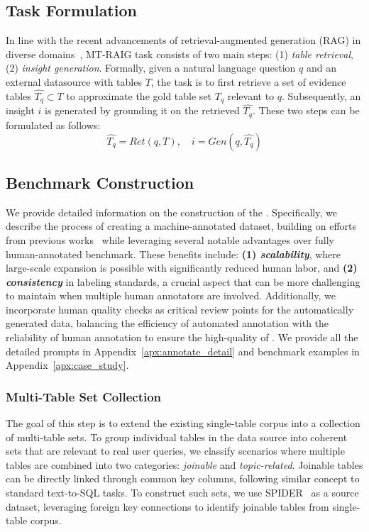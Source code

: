 \subsection{Task Formulation}
In line with the recent advancements of retrieval-augmented generation (RAG) in diverse domains~\citep{ram-etal-2023-context,shi-etal-2024-replug}, \textsc{MT-RAIG} task consists of two main steps: (1) \textit{table retrieval}, (2) \textit{insight generation}. 
Formally, given a natural language question $q$ and an external datasource with tables $T$, the task is to first retrieve a set of evidence tables $\hat{T_{q}} \subset T$ to approximate the gold table set $T_{q}$ relevant to $q$. Subsequently, an insight $i$ is generated by grounding it on the retrieved $\hat{T_{q}}$. These two steps can be formulated as follows:
\begin{equation}
    \hat{T_q} = Ret(q, T), \quad i = Gen(q, \hat{T_q})
\end{equation}

\subsection{Benchmark Construction}
We provide detailed information on the construction of the \bench.
Specifically, we describe the process of creating a machine-annotated dataset, building on efforts from previous works~\citep{tang2024multihoprag,wei2024longform,ni2024mixeval,kim2024evaluatinglanguagemodelssynthetic,yao2024taubenchbenchmarktoolagentuserinteraction} while leveraging several notable advantages over fully human-annotated benchmark. 
These benefits include: \textbf{(1) \textit{scalability}}, where large-scale expansion is possible with significantly reduced human labor, 
and \textbf{(2) \textit{consistency}} in labeling standards, a crucial aspect that can be more challenging to maintain when multiple human annotators are involved.
Additionally, we incorporate human quality checks as critical review points for the automatically generated data, balancing the efficiency of automated annotation with the reliability of human annotation to ensure the high-quality of \bench.
We provide all the detailed prompts in Appendix~\ref{apx:annotate_detail} and benchmark examples in Appendix~\ref{apx:case_study}.


\subsubsection{Multi-Table Set Collection}
The goal of this step is to extend the existing single-table corpus into a collection of multi-table sets. 
To group individual tables in the data source into coherent sets that are relevant to real user queries, we classify scenarios where multiple tables are combined into two categories: \textit{joinable} and \textit{topic-related}.
Joinable tables can be directly linked through common key columns, following similar concept to standard text-to-SQL tasks. 
To construct such sets, we use SPIDER~\cite{Yu2018SpiderAL} as a source dataset, leveraging foreign key connections to identify joinable tables from single-table corpus. 

